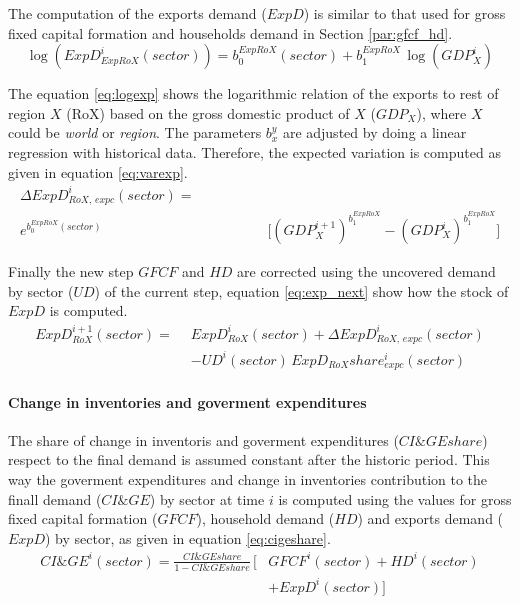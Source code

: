 The computation of the exports demand ($ExpD$) is similar to that used for gross fixed capital formation and households demand in Section
\ref{par:gfcf_hd}.
\begin{equation}
\log\left(ExpD^i_{ExpRoX}(sector)\right) = b_0^{ExpRoX}(sector) + b_1^{ExpRoX}\,\log\left(GDP^i_X\right)\label{eq:logexp}
\end{equation}

The equation \eqref{eq:logexp} shows the logarithmic relation of the exports to rest of region $X$ (RoX) based on the gross domestic product of $X$ ($GDP_X$), where $X$ could be \emph{world} or \emph{region}. The parameters $b_x^y$ are adjusted by doing a linear regression with historical data. Therefore, the expected variation is computed as given in equation \eqref{eq:varexp}.
\begin{align}
\Delta ExpD^i_{RoX,\,expc}(sector) =\hspace{50pt}& \nonumber\\e^{b_0^{ExpRoX}(sector)}&\,\Big[\left(GDP^{i+1}_X\right)^{b_1^{ExpRoX}}-\left(GDP^i_X\right)^{b_1^{ExpRoX}}\Big]\label{eq:varexp}
\end{align}

Finally the new step $GFCF$ and $HD$ are corrected using the uncovered demand by sector ($UD$) of the current step, equation \eqref{eq:exp_next} show how the stock of $ExpD$ is computed.
    \begin{align}
    ExpD^{i+1}_{RoX}(sector) = \hspace{5pt}&ExpD^i_{RoX}(sector)+\Delta ExpD^i_{RoX,\,expc}(sector)\nonumber\\
    &-UD^i(sector)\,ExpD_{RoX}share^i_{expc}(sector)\label{eq:exp_next}
    \end{align}


\paragraph{Change in inventories and goverment expenditures}


The share of change in inventoris and goverment expenditures ($CI\&GEshare$) respect to the final demand is assumed constant after the historic period. This way the goverment expenditures and change in inventories contribution to the finall demand ($CI\&GE$) by sector at time $i$ is computed using the values for gross fixed capital formation ($GFCF$), household demand ($HD$) and exports demand ($ExpD$) by sector, as given in equation \eqref{eq:cigeshare}.
\begin{align}
CI\&GE^i(sector)=\frac{CI\&GEshare}{1-CI\&GEshare}\,\Big[&GFCF^i(sector)+HD^i(sector)\nonumber \\&+ExpD^i(sector)\Big]\label{eq:cigeshare}
\end{align}



